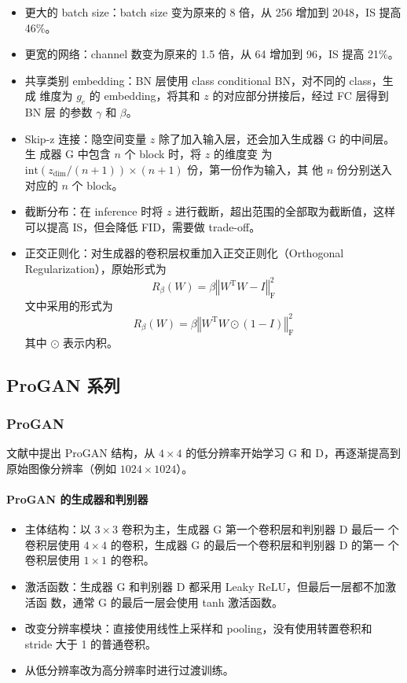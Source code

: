 \begin{itemize}
  \item 更大的 batch size：batch size 变为原来的 8 倍，从 256 增加到 2048，IS 提高 46\%。
  \item 更宽的网络：channel 数变为原来的 1.5 倍，从 64 增加到 96，IS 提高 21\%。
  \item 共享类别 embedding：BN 层使用 class conditional BN，对不同的 class，生成
    维度为 $g_e$ 的 embedding，将其和 $z$ 的对应部分拼接后，经过 FC 层得到 BN 层
    的参数 $\gamma$ 和 $\beta$。
  \item Skip-z 连接：隐空间变量 $z$ 除了加入输入层，还会加入生成器 G 的中间层。生
    成器 G 中包含 $n$ 个 block 时，将 $z$ 的维度变
    为 $\mathrm{int}({z}_{\dim} / (n+1)) \times (n+1)$ 份，第一份作为输入，其
    他 $n$ 份分别送入对应的 $n$ 个 block。
  \item 截断分布：在 inference 时将 $z$ 进行截断，超出范围的全部取为截断值，这样
    可以提高 IS，但会降低 FID，需要做 trade-off。
  \item 正交正则化：对生成器的卷积层权重加入正交正则化（Orthogonal
    Regularization），原始形式为
    \begin{equation}
      R_{\beta}(W) = \beta \left\Vert W^{\mathrm{T}}W-I\right\Vert _{\mathrm{F}}^2
    \end{equation}
    文中采用的形式为
    \begin{equation}
      R_{\beta}(W) = \beta \left\Vert W^{\mathrm{T}}W \odot (1-I)\right\Vert _{\mathrm{F}}^2
    \end{equation}
    其中 $\odot$ 表示内积。
\end{itemize}

\subsection{ProGAN 系列}
\subsubsection{ProGAN}
文献中提出 ProGAN 结构，从 $4 \times 4$ 的低分辨率开始学习 G
和 D，再逐渐提高到原始图像分辨率（例如 $1024 \times 1024$）。

\paragraph{ProGAN 的生成器和判别器}
\begin{itemize}
  \item 主体结构：以 $3 \times 3$ 卷积为主，生成器 G 第一个卷积层和判别器 D 最后一
    个卷积层使用 $4 \times 4$ 的卷积，生成器 G 的最后一个卷积层和判别器 D 的第一
    个卷积层使用 $1 \times 1$ 的卷积。
  \item 激活函数：生成器 G 和判别器 D 都采用 Leaky ReLU，但最后一层都不加激活函
    数，通常 G 的最后一层会使用 tanh 激活函数。
  \item 改变分辨率模块：直接使用线性上采样和 pooling，没有使用转置卷积和 stride
    大于 1 的普通卷积。
  \item 从低分辨率改为高分辨率时进行过渡训练。
\end{itemize}

